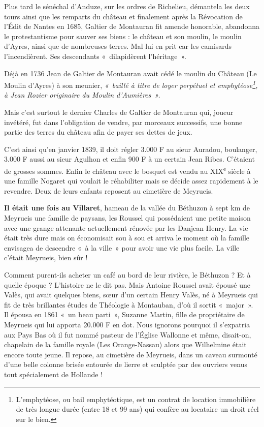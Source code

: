Plus tard le sénéchal d’Anduze, sur les ordres de Richelieu, démantela les deux tours ainsi que
les remparts du château et finalement après la Révocation de l’Édit de Nantes en 1685, Galtier
de Montauran fit amende honorable, abandonna le protestantisme pour sauver ses biens : le
château et son moulin, le moulin d’Ayres, ainsi que de nombreuses terres.
Mal lui en prit car les camisards l’incendièrent. Ses descendants «~dilapidèrent l’héritage~».

Déjà en 1736 Jean de Galtier de Montauran avait cédé le moulin du Château (Le Moulin
d’Ayres) à son meunier, \textit{«~baillé à titre de loyer perpétuel et emphytéose\footnote{L'emphytéose, ou bail emphytéotique, est un contrat de location immobilière de très longue durée (entre 18 et 99 ans) qui confère au locataire un droit réel sur le bien.}, à Jean Rozier originaire du Moulin d’Aumières~».}

Mais c’est surtout le dernier Charles de Galtier de Montauran qui, joueur invétéré, fut dans
l’obligation de vendre, par morceaux successifs, une bonne partie des terres du château afin
de payer ses dettes de jeux.

C’est ainsi qu’en janvier 1839, il doit régler 3.000 F au sieur Auradou, boulanger, 3.000 F aussi
au sieur Agulhon et enfin 900 F à un certain Jean Ribes. C’étaient de grosses sommes. Enfin le
château avec le bosquet est vendu au XIX\textsuperscript{e} siècle à une famille Nogaret qui voulait le réhabiliter mais se décide assez rapidement à le revendre. Deux de leurs enfants reposent au cimetière de Meyrueis.

\textbf{Il était une fois au Villaret}, hameau de la vallée du Béthuzon à sept km de Meyrueis une
famille de paysans, les Roussel qui possédaient une petite maison avec une grange attenante
actuellement rénovée par les Danjean-Henry. La vie était très dure mais on économisait sou
à sou et arriva le moment où la famille envisagea de descendre «~à la ville~» pour avoir une
vie plus facile. La ville c’était Meyrueis, bien sûr !

Comment purent-ils acheter un café au bord de leur rivière, le Béthuzon ? Et à quelle époque ?
L’histoire ne le dit pas. Mais Antoine Roussel avait épousé une Valès, qui avait quelques
biens, sœur d’un certain Henry Valès, né à Meyrueis qui fit de très brillantes études de
Théologie à Montauban, d’où il sortit «~major~». Il épousa en 1861 «~un beau parti~», Suzanne
Martin, fille de propriétaire de Meyrueis qui lui apporta 20.000 F en dot. Nous ignorons
pourquoi il s’expatria aux Pays Bas où il fut nommé pasteur de l’Église Wallonne et même,
disait-on, chapelain de la famille royale (Les Orange-Nassau) alors que Wilhelmine était
encore toute jeune. Il repose, au cimetière de Meyrueis, dans un caveau surmonté d’une belle
colonne brisée entourée de lierre et sculptée par des ouvriers venus tout spécialement de
Hollande !

